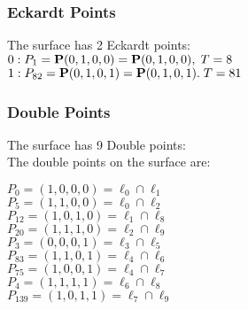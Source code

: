 \documentclass{article}
\newcommand{\bP}{{\bf P}}
\begin{document}
{\subsubsection*{Eckardt Points}
The surface has 2 Eckardt points:\\
$0 : P_{1}=\bP(0, 1, 0, 0) = \bP(0, 1, 0, 0),\; T= 8$\\
$1 : P_{82}=\bP(0, 1, 0, 1) = \bP(0, 1, 0, 1).\; T= 81$\\
\subsubsection*{Double Points}
The surface has 9 Double points:\\
The double points on the surface are:\\
\begin{multicols}{2}
\noindent
$P_{0} = ( 1, 0, 0, 0 ) = \ell_{0} \cap \ell_{1} $\\
$P_{5} = ( 1, 1, 0, 0 ) = \ell_{0} \cap \ell_{2} $\\
$P_{12} = ( 1, 0, 1, 0 ) = \ell_{1} \cap \ell_{8} $\\
$P_{20} = ( 1, 1, 1, 0 ) = \ell_{2} \cap \ell_{9} $\\
$P_{3} = ( 0, 0, 0, 1 ) = \ell_{3} \cap \ell_{5} $\\
$P_{83} = ( 1, 1, 0, 1 ) = \ell_{4} \cap \ell_{6} $\\
$P_{75} = ( 1, 0, 0, 1 ) = \ell_{4} \cap \ell_{7} $\\
$P_{4} = ( 1, 1, 1, 1 ) = \ell_{6} \cap \ell_{8} $\\
$P_{139} = ( 1, 0, 1, 1 ) = \ell_{7} \cap \ell_{9} $\\
\end{multicols}
}
\end{document}
